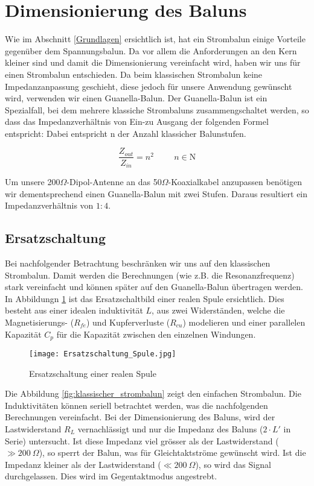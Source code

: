 \section{Dimensionierung des Baluns}

Wie im Abschnitt \ref{Grundlagen} ersichtlich ist, hat ein Strombalun einige Vorteile gegenüber dem Spannungsbalun. Da vor allem die Anforderungen an den Kern kleiner sind und damit die Dimensionierung vereinfacht wird, haben wir uns für einen Strombalun entschieden. Da beim klassischen Strombalun keine Impedanzanpassung geschieht, diese jedoch für unsere Anwendung gewünscht wird, verwenden wir einen Guanella-Balun. Der Guanella-Balun ist ein Spezialfall, bei dem mehrere klassiche Strombaluns zusammengschaltet werden, so dass das Impedanzverhältnis von Ein-zu Ausgang der folgenden Formel entspricht:
Dabei entspricht n der Anzahl klassicher Balunstufen.

\begin{equation}
	\frac{Z_{out}}{Z_{in}}=n^{2} \hspace{1cm} n\in\mathrm{N}
\end{equation}

Um unsere 200$\Omega$-Dipol-Antenne an das 50$\Omega$-Koaxialkabel anzupassen benötigen wir dementsprechend einen Guanella-Balun mit zwei Stufen. Daraus resultiert ein Impedanzverhältnis von \(1:4\).

\subsection{Ersatzschaltung}
Bei nachfolgender Betrachtung beschränken wir uns auf den klassischen Strombalun. Damit werden die Berechnungen (wie z.B. die Resonanzfrequenz) stark vereinfacht und können später auf den Guanella-Balun übertragen werden. In Abbildungn \ref{fig:ersatz_spule} ist das Ersatzschaltbild einer realen Spule ersichtlich. Dies besteht aus einer idealen induktivität $L$, aus zwei Widerständen, welche die Magnetisierungs- ($R_{fe}$) und Kupferverluste ($R_{cu}$) modelieren und einer parallelen Kapazität $C_{p}$ für die Kapazität zwischen den einzelnen Windungen.

\begin{figure}[H]
	\centering
	\texttt{[image: Ersatzschaltung\_Spule.jpg]}
	\caption{Ersatzschaltung einer realen Spule}\label{fig:ersatz_spule}
\end{figure}

Die Abbildung \ref{fig:klassischer_strombalun} zeigt den einfachen Strombalun. Die Induktivitäten können seriell betrachtet werden, was die nachfolgenden Berechnungen vereinfacht. Bei der Dimensionierung des Baluns, wird der Lastwiderstand $R_{L}$ vernachlässigt und nur die Impedanz des Baluns ($2\cdot L'$ in Serie) untersucht. Ist diese Impedanz viel grösser als der Lastwiderstand ($\gg \SI{200}{\Omega}$), so sperrt der Balun, was für Gleichtaktströme gewünscht wird. Ist die Impedanz kleiner als der Lastwiderstand ($\ll \SI{200}{\Omega}$), so  wird das Signal durchgelassen. Dies wird im Gegentaktmodus angestrebt.

